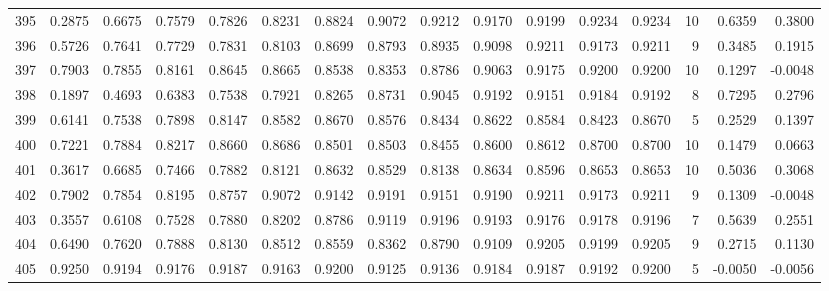 \begin{tabular}{lrrrrrrrrrrrrrrr}
395 &      0.2875 &  0.6675 &  0.7579 &  0.7826 &  0.8231 &  0.8824 &  0.9072 &  0.9212 &  0.9170 &  0.9199 &   0.9234 &     0.9234 &     10 &                    0.6359 &                     0.3800 \\
396 &      0.5726 &  0.7641 &  0.7729 &  0.7831 &  0.8103 &  0.8699 &  0.8793 &  0.8935 &  0.9098 &  0.9211 &   0.9173 &     0.9211 &      9 &                    0.3485 &                     0.1915 \\
397 &      0.7903 &  0.7855 &  0.8161 &  0.8645 &  0.8665 &  0.8538 &  0.8353 &  0.8786 &  0.9063 &  0.9175 &   0.9200 &     0.9200 &     10 &                    0.1297 &                    -0.0048 \\
398 &      0.1897 &  0.4693 &  0.6383 &  0.7538 &  0.7921 &  0.8265 &  0.8731 &  0.9045 &  0.9192 &  0.9151 &   0.9184 &     0.9192 &      8 &                    0.7295 &                     0.2796 \\
399 &      0.6141 &  0.7538 &  0.7898 &  0.8147 &  0.8582 &  0.8670 &  0.8576 &  0.8434 &  0.8622 &  0.8584 &   0.8423 &     0.8670 &      5 &                    0.2529 &                     0.1397 \\
400 &      0.7221 &  0.7884 &  0.8217 &  0.8660 &  0.8686 &  0.8501 &  0.8503 &  0.8455 &  0.8600 &  0.8612 &   0.8700 &     0.8700 &     10 &                    0.1479 &                     0.0663 \\
401 &      0.3617 &  0.6685 &  0.7466 &  0.7882 &  0.8121 &  0.8632 &  0.8529 &  0.8138 &  0.8634 &  0.8596 &   0.8653 &     0.8653 &     10 &                    0.5036 &                     0.3068 \\
402 &      0.7902 &  0.7854 &  0.8195 &  0.8757 &  0.9072 &  0.9142 &  0.9191 &  0.9151 &  0.9190 &  0.9211 &   0.9173 &     0.9211 &      9 &                    0.1309 &                    -0.0048 \\
403 &      0.3557 &  0.6108 &  0.7528 &  0.7880 &  0.8202 &  0.8786 &  0.9119 &  0.9196 &  0.9193 &  0.9176 &   0.9178 &     0.9196 &      7 &                    0.5639 &                     0.2551 \\
404 &      0.6490 &  0.7620 &  0.7888 &  0.8130 &  0.8512 &  0.8559 &  0.8362 &  0.8790 &  0.9109 &  0.9205 &   0.9199 &     0.9205 &      9 &                    0.2715 &                     0.1130 \\
405 &      0.9250 &  0.9194 &  0.9176 &  0.9187 &  0.9163 &  0.9200 &  0.9125 &  0.9136 &  0.9184 &  0.9187 &   0.9192 &     0.9200 &      5 &                   -0.0050 &                    -0.0056 \\

\end{tabular}
